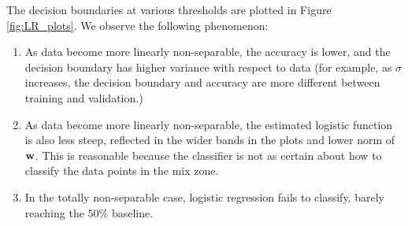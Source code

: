 The decision boundaries at various thresholds are plotted in Figure \ref{fig:LR_plots}. We observe the following phenomenon:
\begin{enumerate}
\item As data become more linearly non-separable, the accuracy is lower, and the decision boundary has higher variance with respect to data (for example, as $\sigma$ increases, the decision boundary and accuracy are more different between training and validation.)
\item As data become more linearly non-separable, the estimated logistic function is also less steep, reflected in the wider bands in the plots and lower norm of $\boldsymbol{\mathbf{w}}$. This is reasonable because the classifier is not as certain about how to classify the data points in the mix zone.
\item In the totally non-separable case, logistic regression fails to classify, barely reaching the $50\%$ baseline.
\end{enumerate}


